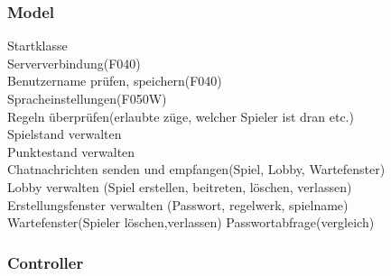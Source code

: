 \documentclass{article}
\begin{document}
	\subsubsection{Model}
		Startklasse \\
		Serververbindung(F040)\\
		Benutzername prüfen, speichern(F040)\\
		Spracheinstellungen(F050W) \\
		Regeln überprüfen(erlaubte züge, welcher Spieler ist dran etc.)\\
		Spielstand verwalten \\
		Punktestand verwalten\\
		Chatnachrichten senden und empfangen(Spiel, Lobby, Wartefenster) \\
		Lobby	verwalten (Spiel erstellen, beitreten, löschen, verlassen)\\	
		Erstellungsfenster verwalten (Passwort, regelwerk, spielname)\\
		Wartefenster(Spieler löschen,verlassen)
		Passwortabfrage(vergleich)\\
	\subsubsection{Controller}
\end{document}
